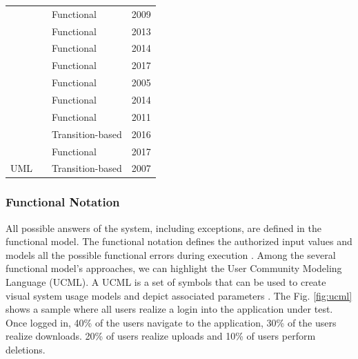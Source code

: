 \documentclass[espaco=umemeio,chapter=TITLE,twoside,openright]{abnt}
\begin{document}
\begin{table}[h]
\begin{tabular}{|l|l|l|l|}
                                        & \cite{Rauf2009}         & Functional           & 2009          \\ \cline{2-4}
                                        & \cite{Schaefer2013}     & Functional           & 2013          \\ \cline{2-4}
                                        & \cite{Paper2014}        & Functional           & 2014          \\ \cline{2-4}
                                        & 
\cite{moscher2017facing}        & Functional           & 2017          \\ \cline{2-4}
                                        & \cite{Kim2005}          & Functional           & 2005          \\ \cline{2-4}
                                        & \cite{Rodrigues2014}    & Functional           & 2014          \\ \cline{2-4}
                                        & \begin{minipage}{0.4\textwidth}\cite{Silveira2011}\end{minipage}     & Functional           & 2011          \\ \cline{2-4}
                                        &
\cite{Vogele2016}    & Transition-based      & 2016          \\ \cline{2-4}
&
\cite{DiAlesio2017}   & Functional      & 2017          \\ \cline{2-4}


\multirow{-10}{*}{UML}                   & \begin{minipage}{0.4\textwidth}\cite{Lenz2007}\end{minipage}         & Transition-based           & 2007          \\ \hline
\end{tabular}
\end{table}


\subsubsection{Functional Notation}

All possible answers of the system, including exceptions, are defined in the functional
model.  The functional notation defines the authorized input values and models all the possible functional errors during execution \cite{utting2010practical}. Among the several functional model's approaches, we can highlight the User Community Modeling Language (UCML). A UCML is a set of symbols that can be used to create visual system usage models and depict associated parameters \cite{Wang2013}. The Fig. \ref{fig:ucml} shows a sample where all users realize a login into the application under test. Once logged in, 40\% of the users navigate to the application, 30\%  of the users realize downloads. 20\% of users realize uploads and 10\% of users perform deletions. 
\end{document}
